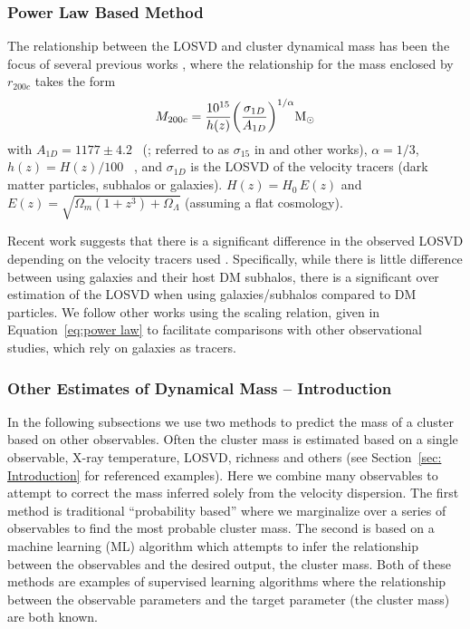 \documentclass[fleqn,usenatbib]{mnras}
\begin{document}
\subsubsection{Power Law Based Method}
The relationship between the LOSVD and cluster dynamical mass has been the focus of several previous works , where the relationship for the mass enclosed by $r_{200c}$ takes the form
\begin{equation}\label{eq:power law}
	M_{200c} = \frac{10^{15}}{h(z)} \bigg{(}\frac{\sigma_{1D}}{A_{1D}} \bigg{)}^{1/\alpha} \hbox{$\mathrm{M}_\odot$}
\end{equation}
with $A_{1D} = 1177 \pm 4.2$ \kms\ (\citealt{Munari2013}; referred to as $\sigma_{15}$ in \citealt{Evrard2008} and other works), $\alpha = 1/3$, $h(z) = H(z)/100$ \kms\ \mpc, and $\sigma_{1D}$ is the LOSVD of the velocity tracers (dark matter particles, subhalos or galaxies). $H(z) = H_0\, E(z)$ and $E(z) = \sqrt{\Omega_m(1+z^3)+\Omega_{\Lambda}}$ (assuming a flat cosmology).

Recent work suggests that there is a significant difference in the observed LOSVD depending on the velocity tracers used \citep{Munari2013}. Specifically, while there is little difference between using galaxies and their host DM subhalos, there is a significant over estimation of the LOSVD when using galaxies/subhalos compared to DM particles. We follow other works  using the scaling relation, given in Equation~\ref{eq:power law} to facilitate comparisons with other observational studies, which rely on galaxies as tracers. 

\subsubsection{Other Estimates of Dynamical Mass -- Introduction}
In the following subsections we use two methods to predict the mass of a cluster based on other observables. Often the cluster mass is estimated based on a single observable, X-ray temperature, LOSVD, richness and others (see Section~\ref{sec: Introduction} for referenced examples). Here we combine many observables to attempt to correct the mass inferred solely from the velocity dispersion. The first method is traditional ``probability based'' where we marginalize over a series of observables to find the most probable cluster mass. The second is based on a machine learning (ML) algorithm which attempts to infer the relationship between the observables and the desired output, the cluster mass. Both of these methods are examples of supervised learning algorithms where the relationship between the observable parameters and the target parameter (the cluster mass) are both known.
\end{document}
